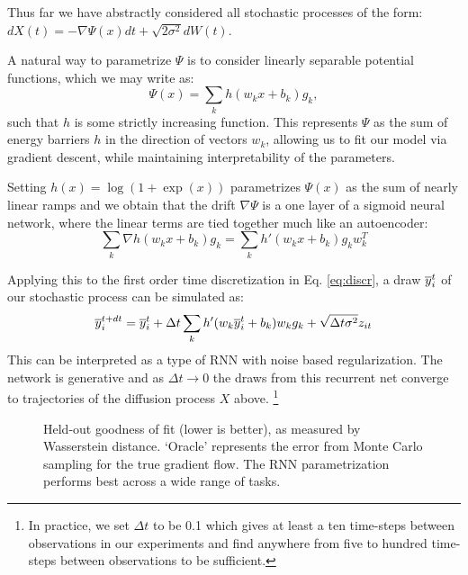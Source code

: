 \documentclass{article}
\begin{document}
Thus far we have abstractly considered all stochastic processes of the form: $dX(t) = -\nabla \Psi(x) dt + \sqrt{2\sigma^{2}} dW(t)$.

A natural way to parametrize $\Psi$ is to consider linearly separable potential functions, which we may write as:
\[\Psi(x) = \sum_k h(w_kx+b_k)g_k,\]
such that $h$ is some strictly increasing function. This represents $\Psi$ as the sum of energy barriers $h$ in the direction of vectors $w_k$, allowing us to fit our model via gradient descent, while maintaining interpretability of the parameters.

Setting $h(x)=\log(1+\exp(x))$ parametrizes $\Psi(x)$ as the sum of nearly linear ramps and we obtain that the drift $\nabla \Psi$ is a one layer of a sigmoid neural network, where the linear terms are tied together much like an autoencoder:
\[\sum_k \nabla h(w_kx+b_k)g_k = \sum_k h'(w_kx+b_k)g_kw_k^T\]

Applying this to the first order time discretization in Eq. \ref{eq:discr}, a draw $\overline{y}^t_i$ of our stochastic process can be simulated as:
\begin{equation}\label{eq:simul}
\overline{y}^{t+dt}_i = \overline{y}^t_i + \Delta t \sum_k h'(w_k\overline{y}^t_i+b_k)w_kg_k + \sqrt{\Delta t\sigma^2 }z_{it}
\end{equation}
This can be interpreted as a type of RNN with noise based regularization. The network is generative and as $\Delta t\to 0$ the draws from this recurrent net converge to trajectories of the diffusion process $X$ above. \footnote{In practice, we set $\Delta t$ to be 0.1 which gives at least a ten time-steps between observations in our experiments and find anywhere from five to hundred time-steps between observations to be sufficient.}


\begin{figure*}
\centering
{}
\vspace{-8pt}
\caption{Held-out goodness of fit (lower is better), as measured by Wasserstein distance. `Oracle' represents the error from Monte Carlo sampling for the true gradient flow. The RNN parametrization performs best across a wide range of tasks.}
\vspace{-8pt}
\end{figure*}
\end{document}

